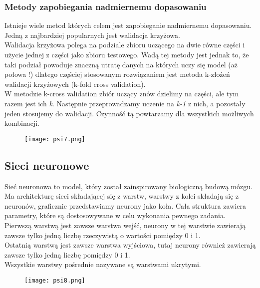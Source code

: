 \documentclass[a4paper,15pt]{article}
\begin{document}
\subsubsection{Metody zapobiegania nadmiernemu dopasowaniu}

Istnieje wiele metod których celem jest zapobieganie nadmiernemu dopasowaniu. Jedną z najbardziej popularnych jest walidacja krzyżowa. \\

Walidacja krzyżowa polega na podziale zbioru uczącego na dwie równe części i użycie jednej z części jako zbioru testowego. Wadą tej metody jest jednak to, że taki podział powoduje znaczną utratę danych na których uczy się model (aż połowa !) dlatego częściej stosowanym rozwiązaniem jest metoda k-złożeń walidacji krzyżowych (k-fold cross validation). \\

W metodzie k-cross validation zbiór uczący znów dzielimy na części, ale tym razem jest ich \textit{k}. Następnie przeprowadzamy uczenie na \textit{k-1} z nich, a pozostały jeden stosujemy do walidacji. Czynność tą powtarzamy dla wszystkich możliwych kombinacji. 

\begin{figure}[H]
\centerline{\texttt{[image: psi7.png]}}
\end{figure}


\subsection{Sieci neuronowe}

Sieć neuronowa to model, który został zainspirowany biologiczną budową mózgu. Ma architekturę sieci składającej się z warstw, warstwy z kolei składają się z neuronów, graficznie przedstawiamy neurony jako koła. Cała struktura zawiera parametry, które są dostosowywane w celu wykonania pewnego zadania. \\
Pierwszą warstwą jest zawsze warstwa wejść, neurony w tej warstwie zawierają zawsze tylko jedną liczbę rzeczywistą o wartości pomiędzy 0 i 1. \\
Ostatnią warstwą jest zawsze warstwa wyjściowa, tutaj neurony również zawierają zawsze tylko jedną liczbę pomiędzy 0 i 1. \\
Wszystkie warstwy pośrednie nazywane są warstwami ukrytymi. 

\begin{figure}[H]
\centerline{\texttt{[image: psi8.png]}}
\end{figure}
\end{document}
